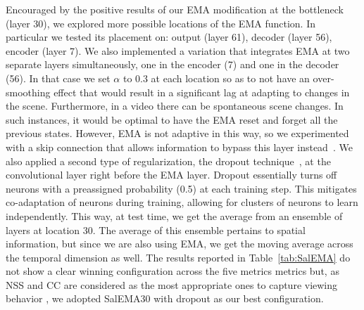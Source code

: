 \documentclass{bmvc2k}
\begin{document}
Encouraged by the positive results of our EMA modification at the bottleneck (layer 30), we explored more possible locations of the EMA function. In particular we tested its placement on: output (layer 61), decoder (layer 56), encoder (layer 7). We also implemented a variation that integrates EMA at two separate layers simultaneously, one in the encoder (7) and one in the decoder (56). In that case we set $\alpha$ to 0.3 at each location so as to not have an over-smoothing effect that would result in a significant lag at adapting to changes in the scene. 
Furthermore, in a video there can be spontaneous scene changes. In such instances, it would be optimal to have the EMA reset and forget all the previous states. However, EMA is not adaptive in this way, so we experimented with a skip connection that allows information to bypass this layer instead~\cite{ResNet}. We also applied a second type of regularization, the dropout technique~\cite{Dropout}, at the convolutional layer right before the EMA layer. Dropout essentially turns off neurons with a preassigned probability (0.5) at each training step. This mitigates co-adaptation of neurons during training, allowing for clusters of neurons to learn independently. This way, at test time, we get the average from an ensemble of layers at location 30. The average of this ensemble pertains to spatial information, but since we are also using EMA, we get the moving average across the temporal dimension as well. 
The results reported in Table~\ref{tab:SalEMA} do not show a clear winning configuration across the five metrics metrics but, as NSS and CC are considered as the most appropriate ones to capture viewing behavior \cite{bylinskii2019different}, we adopted SalEMA30 with dropout as our best configuration. 
\end{document}

